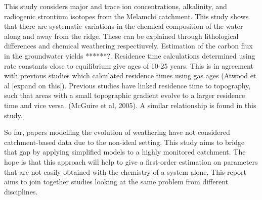 This study considers major and trace ion concentrations, alkalinity, and radiogenic strontium isotopes from the Melamchi catchment. This study shows that there are systematic variations in the chemical composition of the water along and away from the ridge. These can be explained through lithological differences and chemical weathering respectiuvely. Estimation of the carbon flux in the groundwater yields ******?. Residence time calculations determined using rate constants close to equilibrium give ages of 10-25 years. This is in agreement with previous studies which calculated residence times using gas ages (Atwood et al [expand on this]). Previous studies have linked residence time to topography, such that areas with a small topographic gradient evolve to a larger residence time and vice versa. (McGuire et al, 2005). A similar relationship is found in this study.

 
\bsk

So far, papers modelling the evolution of weathering have not considered catchment-based data due to the non-ideal setting. This study aims to bridge that gap by applying simplified models to a highly monitored catchment. The hope is that this approach will help to give a first-order estimation on parameters that are not easily obtained with the chemistry of a system alone. This report aims to join together studies looking at the same problem from different disciplines.











